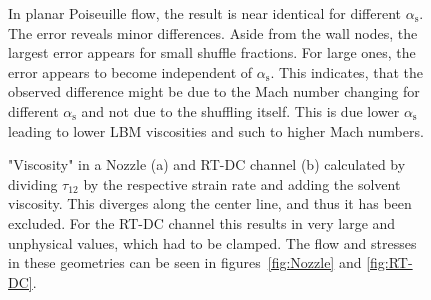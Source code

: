 \documentclass[a4paper,12pt]{scrartcl}
\begin{document}
		\begin{figure}[H]
		\centering
		\caption{In planar Poiseuille flow, the result is near identical for different $\alpha_\text{s}$. The error reveals minor differences. Aside from the wall nodes, the largest error appears for small shuffle fractions. For large ones, the error appears to become independent of $\alpha_\text{s}$. This indicates, that the observed difference might be due to the Mach number changing for different $\alpha_\text{s}$ and not due to the shuffling itself. This is due lower $\alpha_\text{s}$ leading to lower LBM viscosities and such to higher Mach numbers.}
		\label{fig:ShuffleInPoiseuille}
	\end{figure}
	
	
	\begin{figure}[H]
		\centering
		\caption{"Viscosity" in a Nozzle (a) and RT-DC channel (b) calculated by dividing $\tau_{12}$ by the respective strain rate and adding the solvent viscosity. This diverges along the center line, and thus it has been excluded. For the RT-DC channel this results in very large and unphysical values, which had to be clamped. The flow and stresses in these geometries can be seen in figures~\ref{fig:Nozzle} and \ref{fig:RT-DC}.}
		\label{fig:Nozzle/RT-DC_eta}
	\end{figure}
	
\end{document}
